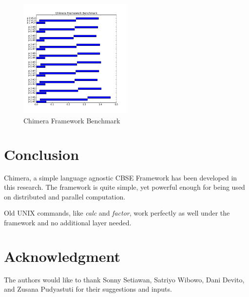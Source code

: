 \documentclass[conference]{IEEEtran}
\begin{document}
\begin{figure}
	\centering
	\includegraphics[width=0.5\textwidth]
		{test/report.png}
	\caption{Chimera Framework Benchmark}
	\label{fig:benchmark}
\end{figure}

\section{Conclusion}

Chimera, a simple language agnostic CBSE Framework has been developed in this research. The framework is quite simple, yet powerful enough for being used on distributed and parallel computation.

Old UNIX commands, like {\it calc} and {\it factor}, work perfectly as well under the framework and
no additional layer needed.


\section*{Acknowledgment}

The authors would like to thank Sonny Setiawan, Satriyo Wibowo, Dani Devito, and Zusana Pudyastuti for their suggestions and inputs.

\ifCLASSOPTIONcaptionsoff
  \newpage
\fi




\end{document}
